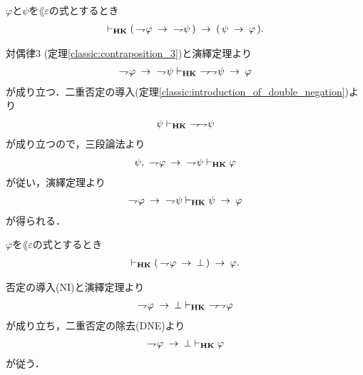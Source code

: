 	\begin{screen}
		\begin{thm}[対偶律4]\label{classic:contraposition_4}
			$\varphi$と$\psi$を$\lang{\varepsilon}$の式とするとき
			\begin{align}
				\vdash_{{\scriptsize \mbox{{\bf HK}}}} (\, \rightharpoondown\hspace{-0.25em} \varphi \hspace{0.25em}\rightarrow\hspace{0.25em}\ \rightharpoondown\hspace{-0.25em} \psi\, )
				\hspace{0.25em}\rightarrow\hspace{0.25em} (\, \psi \hspace{0.25em}\rightarrow\hspace{0.25em} \varphi\, ).
			\end{align}
		\end{thm}
	\end{screen}
	
	\begin{sketch}
		対偶律3 (定理\ref{classic:contraposition_3})と演繹定理より
		\begin{align}
			\negation \varphi \rarrow\ \negation \psi \provable{\mbox{{\bf HK}}}\ 
			\negation \negation \psi \rarrow \varphi
		\end{align}
		が成り立つ．二重否定の導入(定理\ref{classic:introduction_of_double_negation})より
		\begin{align}
			\psi \vdash_{{\scriptsize \mbox{{\bf HK}}}}\ \rightharpoondown\hspace{-0.25em} \rightharpoondown\hspace{-0.25em} \psi
		\end{align}
		が成り立つので，三段論法より
		\begin{align}
			\psi,\ \rightharpoondown\hspace{-0.25em} \varphi \hspace{0.25em}\rightarrow\hspace{0.25em}\ \rightharpoondown\hspace{-0.25em} \psi \vdash_{{\scriptsize \mbox{{\bf HK}}}} \varphi
		\end{align}
		が従い，演繹定理より
		\begin{align}
			\rightharpoondown\hspace{-0.25em} \varphi \hspace{0.25em}\rightarrow\hspace{0.25em}\ \rightharpoondown\hspace{-0.25em} \psi \vdash_{{\scriptsize \mbox{{\bf HK}}}} 
			\psi \hspace{0.25em}\rightarrow\hspace{0.25em} \varphi
		\end{align}
		が得られる．
		\QED
	\end{sketch}
	
	\begin{screen}
		\begin{thm}[背理法の原理]
		\label{classic:proof_by_contradiction}
			$\varphi$を$\lang{\varepsilon}$の式とするとき
			\begin{align}
				\vdash_{{\scriptsize \mbox{{\bf HK}}}} (\, \rightharpoondown\hspace{-0.25em} \varphi \hspace{0.25em}\rightarrow\hspace{0.25em} \bot\, )
				\hspace{0.25em}\rightarrow\hspace{0.25em} \varphi.
			\end{align}
		\end{thm}
	\end{screen}
	
	\begin{sketch}
		否定の導入(NI)と演繹定理より
		\begin{align}
			\negation \varphi \rarrow \bot \provable{\mbox{{\bf HK}}}\ 
			\negation \negation \varphi
		\end{align}
		が成り立ち，二重否定の除去(DNE)より
		\begin{align}
			\rightharpoondown\hspace{-0.25em} \varphi \hspace{0.25em}\rightarrow\hspace{0.25em} \bot \vdash_{{\scriptsize \mbox{{\bf HK}}}} \varphi
		\end{align}
		が従う．
		\QED
	\end{sketch}
	
